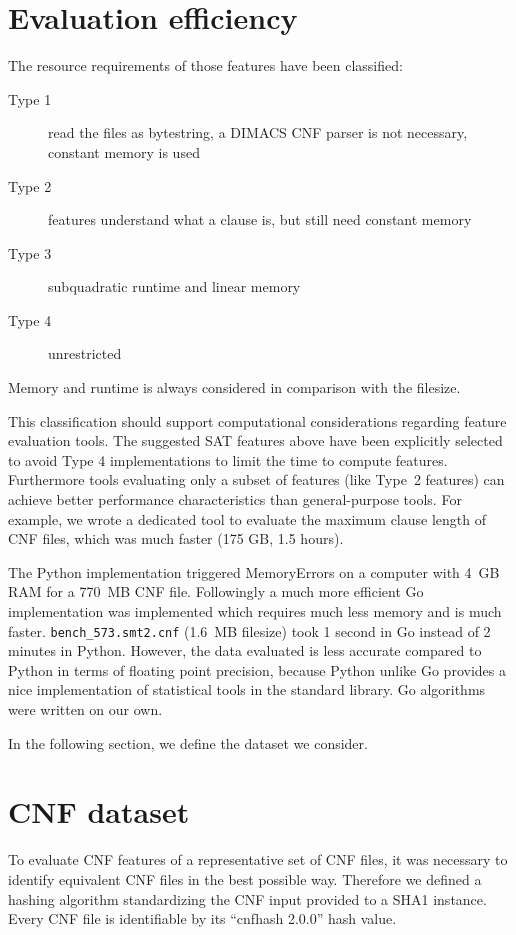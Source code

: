\section{Evaluation efficiency}
\label{sec:features-efficiency}
%
The resource requirements of those features have been classified:
\begin{description}
  \item[Type 1] read the files as bytestring, a DIMACS CNF parser is not necessary, constant memory is used
  \item[Type 2] features understand what a clause is, but still need constant memory
  \item[Type 3] subquadratic runtime and linear memory
  \item[Type 4] unrestricted
\end{description}
%
Memory and runtime is always considered in comparison with the filesize.

This classification should support computational considerations regarding feature evaluation tools.
The suggested SAT features above have been explicitly selected to avoid Type 4 implementations to limit the time to compute features.
Furthermore tools evaluating only a subset of features (like Type~2 features) can achieve better performance characteristics than general-purpose tools. For example, we wrote a dedicated tool to evaluate the maximum clause length of CNF files, which was much faster (175 GB, 1.5 hours).

The Python implementation triggered MemoryErrors on a computer with 4~GB RAM for a 770~MB CNF file.
Followingly a much more efficient Go implementation was implemented which requires much less memory and is much faster.
\texttt{bench\_573.smt2.cnf} (1.6~MB filesize) took 1 second in Go instead of 2 minutes in Python.
However, the data evaluated is less accurate compared to Python in terms of floating point precision, because Python unlike Go provides a nice implementation of statistical tools in the standard library. Go algorithms were written on our own.

In the following section, we define the dataset we consider.

\section{CNF dataset}
\label{sec:features-dataset}
%
To evaluate CNF features of a representative set of CNF files, it was necessary to identify equivalent CNF files in the best possible way.
Therefore we defined a hashing algorithm standardizing the CNF input provided to a SHA1 instance. Every CNF file is identifiable by its
\enquote{cnfhash 2.0.0} hash value.

